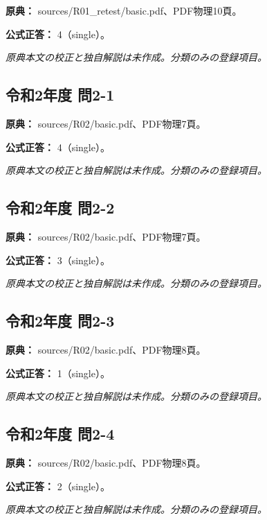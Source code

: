\noindent\textbf{原典：} sources/R01\_retest/basic.pdf、PDF物理10頁。

\textbf{公式正答：} 4（single）。

\par\textit{原典本文の校正と独自解説は未作成。分類のみの登録項目。}

\subsection{令和2年度 問2-1}
\label{q:r02-reg-basic-2-1}

\noindent\textbf{原典：} sources/R02/basic.pdf、PDF物理7頁。

\textbf{公式正答：} 4（single）。

\par\textit{原典本文の校正と独自解説は未作成。分類のみの登録項目。}

\subsection{令和2年度 問2-2}
\label{q:r02-reg-basic-2-2}

\noindent\textbf{原典：} sources/R02/basic.pdf、PDF物理7頁。

\textbf{公式正答：} 3（single）。

\par\textit{原典本文の校正と独自解説は未作成。分類のみの登録項目。}

\subsection{令和2年度 問2-3}
\label{q:r02-reg-basic-2-3}

\noindent\textbf{原典：} sources/R02/basic.pdf、PDF物理8頁。

\textbf{公式正答：} 1（single）。

\par\textit{原典本文の校正と独自解説は未作成。分類のみの登録項目。}

\subsection{令和2年度 問2-4}
\label{q:r02-reg-basic-2-4}

\noindent\textbf{原典：} sources/R02/basic.pdf、PDF物理8頁。

\textbf{公式正答：} 2（single）。

\par\textit{原典本文の校正と独自解説は未作成。分類のみの登録項目。}

